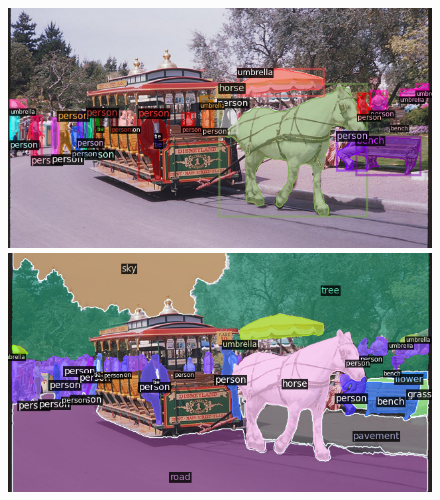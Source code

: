 \begin{figure}[h!]
    \begin{minipage}[b]{.45\linewidth}
    \includegraphics[width=\linewidth]{vis/success/val_159_det.png}
    \end{minipage}
    \begin{minipage}[b]{.45\linewidth}
    \includegraphics[width=\linewidth]{vis/success/val_159_pan.png}
    \end{minipage}
    
    

\end{figure}
